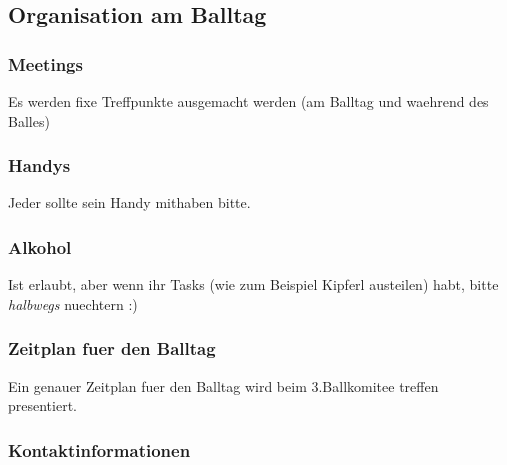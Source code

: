 \documentclass[12pt]{article}
\begin{document}
\subsection{Organisation am Balltag}
\subsubsection{Meetings}
Es werden fixe Treffpunkte ausgemacht werden (am Balltag und waehrend des Balles)
\subsubsection{Handys}
Jeder sollte sein Handy mithaben bitte.
\subsubsection{Alkohol}
Ist erlaubt, aber wenn ihr Tasks (wie zum Beispiel Kipferl austeilen) habt, bitte \textit{halbwegs} nuechtern :)
\subsubsection{Zeitplan fuer den Balltag}
Ein genauer Zeitplan fuer den Balltag wird beim 3.Ballkomitee treffen presentiert.
\subsubsection{Kontaktinformationen}
\end{document}
